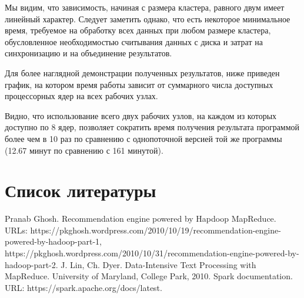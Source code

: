 \documentclass[12pt,a4paper]{report}
\begin{document}
Мы видим, что зависимость, начиная с размера кластера, равного двум имеет линейный характер. Следует заметить однако, что есть некоторое минимальное время, требуемое на обработку всех данных при любом размере кластера, обусловленное необходимостью считывания данных с диска и затрат на синхронизацию и на объединение результатов.

Для более наглядной демонстрации полученных результатов, ниже приведен график, на котором время работы зависит от суммарного числа доступных процессорных ядер на всех рабочих узлах.
\begin{figure}[H]
\centering
\end{figure}

Видно, что использование всего двух рабочих узлов, на каждом из которых доступно по 8 ядер, позволяет сократить время получения результата программой более чем в 10 раз по сравнению с однопоточной версией той же программы (12.67 минут по сравнению с 161 минутой).

\section*{Список литературы} 
\renewcommand{\chapter}[2]{}
\begin{thebibliography}{@@}
   Pranab Ghosh. Recommendation engine powered by Hapdoop MapReduce. URLs: https://pkghosh.wordpress.com/2010/10/19/recommendation-engine-powered-by-hadoop-part-1, https://pkghosh.wordpress.com/2010/10/31/recommendation-engine-powered-by-hadoop-part-2.
   J. Lin, Ch. Dyer. Data-Intensive Text Processing with MapReduce. University of Maryland, College Park, 2010.
   Spark documentation. URL: https://spark.apache.org/docs/latest. 
\end{thebibliography}
\end{document}
